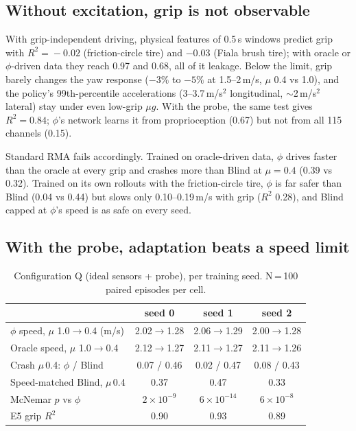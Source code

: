 \documentclass[conference]{IEEEtran}
\newcommand{\phiA}{\ensuremath{\phi}}
\begin{document}
\subsection{Without excitation, grip is not observable}
With grip-independent driving, physical features of 0.5\,s windows predict grip with $R^2\!=\!-0.02$ (friction-circle tire) and $-0.03$ (Fiala brush tire); with oracle or \phiA{}-driven data they reach 0.97 and 0.68, all of it leakage. Below the limit, grip barely changes the yaw response ($-3\%$ to $-5\%$ at 1.5--2\,m/s, $\mu$ 0.4 vs 1.0), and the policy's 99th-percentile accelerations (3--3.7\,m/s$^2$ longitudinal, $\sim$2\,m/s$^2$ lateral) stay under even low-grip $\mu g$. With the probe, the same test gives $R^2\!=\!0.84$; \phiA{}'s network learns it from proprioception (0.67) but not from all 115 channels (0.15).

Standard RMA fails accordingly. Trained on oracle-driven data, \phiA{} drives faster than the oracle at every grip and crashes more than Blind at $\mu\!=\!0.4$ (0.39 vs 0.32). Trained on its own rollouts with the friction-circle tire, \phiA{} is far safer than Blind (0.04 vs 0.44) but slows only 0.10--0.19\,m/s with grip ($R^2$ 0.28), and Blind capped at \phiA{}'s speed is as safe on every seed.

\subsection{With the probe, adaptation beats a speed limit}
\begin{table}[t]
\centering
\caption{Configuration Q (ideal sensors + probe), per training seed. N\,=\,100 paired episodes per cell.}
\label{tab:q}
\begin{tabular}{@{}lccc@{}}
\toprule
 & seed 0 & seed 1 & seed 2\\
\midrule
\phiA{} speed, $\mu$ 1.0$\to$0.4 (m/s) & 2.02$\to$1.28 & 2.06$\to$1.29 & 2.00$\to$1.28\\
Oracle speed, $\mu$ 1.0$\to$0.4 & 2.12$\to$1.27 & 2.11$\to$1.27 & 2.11$\to$1.26\\
Crash $\mu$\,0.4: \phiA{} / Blind & 0.07 / 0.46 & 0.02 / 0.47 & 0.08 / 0.43\\
Speed-matched Blind, $\mu$\,0.4 & 0.37 & 0.47 & 0.33\\
\quad McNemar $p$ vs \phiA{} & $2\!\times\!10^{-9}$ & $6\!\times\!10^{-14}$ & $6\!\times\!10^{-8}$\\
E5 grip $R^2$ & 0.90 & 0.93 & 0.89\\
\bottomrule
\end{tabular}
\end{table}
\end{document}
